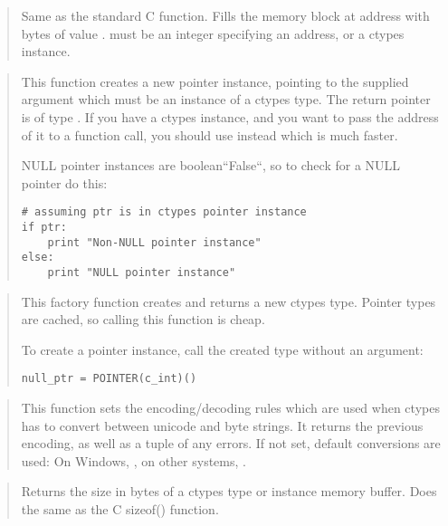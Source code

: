 \begin{quote}

Same as the standard C  function.  Fills the memory block
at address  with  bytes of value .   must be
an integer specifying an address, or a ctypes instance.
\end{quote}

\begin{quote}

This function creates a new pointer instance, pointing to the
supplied argument which must be an instance of a ctypes type.  The
return pointer is of type .  If you have
a ctypes instance, and you want to pass the address of it to a
function call, you should use  instead which is
much faster.

NULL pointer instances are boolean``False``, so to check for a
NULL pointer do this:
\begin{verbatim}
# assuming ptr is in ctypes pointer instance
if ptr:
    print "Non-NULL pointer instance"
else:
    print "NULL pointer instance"
\end{verbatim}
\end{quote}

\begin{quote}

This factory function creates and returns a new ctypes type.
Pointer types are cached, so calling this function is cheap.

To create a  pointer instance, call the created type
without an argument:
\begin{verbatim}
null_ptr = POINTER(c_int)()
\end{verbatim}
\end{quote}

\begin{quote}

This function sets the encoding/decoding rules which are used when
ctypes has to convert between unicode and byte strings.  It
returns the previous encoding, as well as a tuple of any errors.
If not set, default conversions are used:
On Windows,  , on other systems, .
\end{quote}

\begin{quote}

Returns the size in bytes of a ctypes type or instance memory
buffer.  Does the same as the C sizeof() function.
\end{quote}

